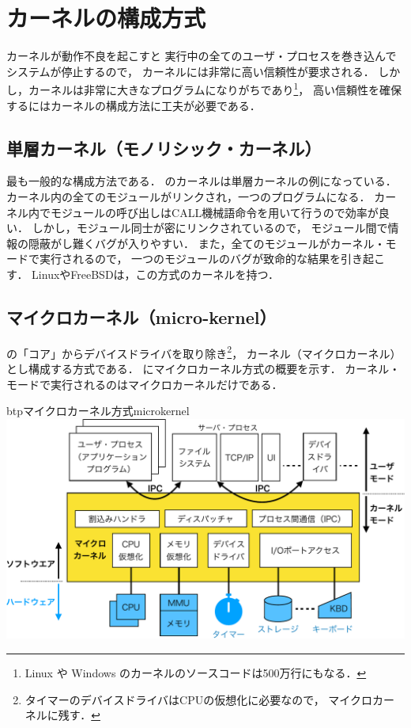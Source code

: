 \section{カーネルの構成方式}
カーネルが動作不良を起こすと
実行中の全てのユーザ・プロセスを巻き込んでシステムが停止するので，
カーネルには非常に高い信頼性が要求される．
しかし，カーネルは非常に大きなプログラムになりがちであり\footnote{
  Linux や Windows のカーネルのソースコードは500万行にもなる\cite{lines}．}，
高い信頼性を確保するにはカーネルの構成方法に工夫が必要である．

\subsection{単層カーネル（モノリシック・カーネル）}
最も一般的な構成方法である．
のカーネルは単層カーネルの例になっている．
カーネル内の全てのモジュールがリンクされ，一つのプログラムになる．
カーネル内でモジュールの呼び出しはCALL機械語命令を用いて行うので効率が良い．
しかし，モジュール同士が密にリンクされているので，
モジュール間で情報の隠蔽がし難くバグが入りやすい．
また，全てのモジュールがカーネル・モードで実行されるので，
一つのモジュールのバグが致命的な結果を引き起こす．
LinuxやFreeBSDは，この方式のカーネルを持つ．

\subsection{マイクロカーネル（micro-kernel）}
の「コア」からデバイスドライバを取り除き\footnote{
  タイマーのデバイスドライバはCPUの仮想化に必要なので，
  マイクロカーネルに残す．}，
カーネル（マイクロカーネル）とし構成する方式である．
にマイクロカーネル方式の概要を示す．
カーネル・モードで実行されるのはマイクロカーネルだけである．

\begin{myfig}{btp}{マイクロカーネル方式}{microkernel}
  \includegraphics[scale=0.66]{Fig/microkernel-crop.pdf}
\end{myfig}


